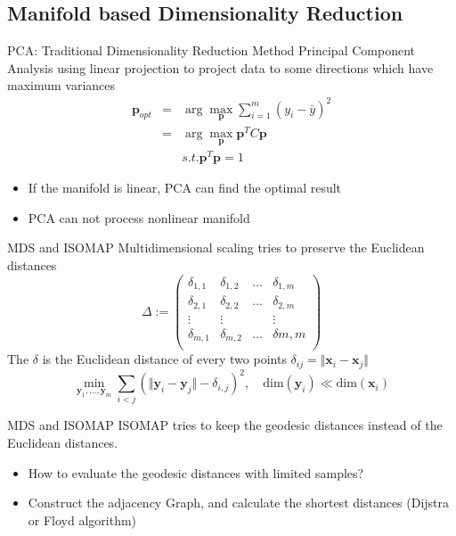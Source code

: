 \documentclass{beamer}
\newcommand{\bol}[1]{\textbf{#1}}
\begin{document}
\begin{darkframes}
    \section{Manifold based Dimensionality Reduction}
    \begin{frame}{PCA: Traditional Dimensionality Reduction Method}
    Principal Component Analysis using linear projection to project data to some directions which have maximum variances
  	\begin{eqnarray*}
  		\bol{p}_{opt} & = & \arg\max_{\bol{p}}\sum_{i = 1}^m(y_i - \bar{y})^2\\
  							& = & \arg\max_{\bol{p}}\bol{p}^TC\bol{p}\\
  							&    &  s.t. \bol{p}^T\bol{p} = 1
  	\end{eqnarray*}
  	\begin{itemize}
  		\item If the manifold is linear, PCA can find the optimal result
  		\item PCA can not process nonlinear manifold
  	\end{itemize}
    \end{frame}
    
    \begin{frame}{MDS and ISOMAP}
    \alert{Multidimensional scaling} tries to preserve the Euclidean distances
    \begin{displaymath}
	\Delta :=
	\left( \begin{array}{cccc}
	\delta_{1,1} & \delta_{1,2} & \ldots & \delta_{1,m} \\
	\delta_{2,1} & \delta_{2,2} & \ldots & \delta_{2,m}\\
	\vdots & \vdots & &\vdots\\
	\delta_{m,1} & \delta_{m,2} &\ldots & \delta{m,m}\\
	\end{array} \right)
   \end{displaymath}
   The $\delta$ is the Euclidean distance of every two points $ \delta_{ij}=\Vert \textbf{x}_i - \textbf{x}_j \Vert$ 
   \[
     \min_{\textbf{y}_1,\ldots,\textbf{y}_m} \sum_{i<j}\left(\Vert \textbf{y}_i - \textbf{y}_j \Vert - 
     \delta_{i,j}\right)^2,\quad \textrm{dim}(\textbf{y}_i) \ll \textrm{dim}(\textbf{x}_i)
   \]
    \end{frame}
   
   
   
    \begin{frame}{MDS and ISOMAP}
     \alert{ISOMAP} tries to keep the geodesic distances instead of the Euclidean distances.
    \begin{itemize}
    	\item How to evaluate the geodesic distances with limited samples?
    	\item Construct the adjacency Graph, and calculate the shortest distances (Dijstra or Floyd algorithm)
    \end{itemize}
   	

\end{frame}
\end{darkframes}
\end{document}
